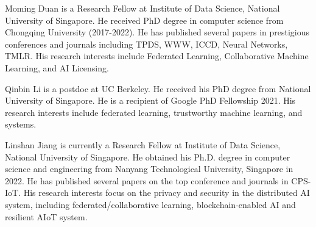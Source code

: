 \documentclass[journal]{IEEEtran}
\begin{document}
\begin{comment}
\section{Biography Section}
If you have an EPS/PDF photo (graphicx package needed), extra braces are
 needed around the contents of the optional argument to biography to prevent
 the LaTeX parser from getting confused when it sees the complicated
 $\backslash${\tt{includegraphics}} command within an optional argument. (You can create
 your own custom macro containing the $\backslash${\tt{includegraphics}} command to make things
 simpler here.)
 
\vspace{11pt}

\bf{If you include a photo:}\vspace{-33pt}
\end{comment}

\begin{IEEEbiography}{Moming Duan}
is a Research Fellow at Institute of Data Science, National University of Singapore. He received PhD degree in computer science from Chongqing University (2017-2022). He has published several papers in prestigious conferences and journals including TPDS, WWW, ICCD, Neural Networks, TMLR. His research interests include Federated Learning, Collaborative Machine Learning, and AI Licensing.
\end{IEEEbiography}


\begin{IEEEbiography}{Qinbin Li}
is a postdoc at UC Berkeley. He received his PhD degree from National University of Singapore. He is a recipient of Google PhD Fellowship 2021. His research interests include federated learning, trustworthy machine learning, and systems.
\end{IEEEbiography}

\begin{IEEEbiography}{Linshan Jiang}
is currently a Research Fellow at Institute of Data Science, National University of Singapore. He obtained his Ph.D. degree in computer science and engineering from Nanyang Technological University, Singapore in 2022. He has published several papers on the top conference and journals in CPS-IoT. His research interests focus on the privacy and security in the distributed AI system, including federated/collaborative learning, blockchain-enabled AI and resilient AIoT system.
\end{IEEEbiography}
\end{document}
